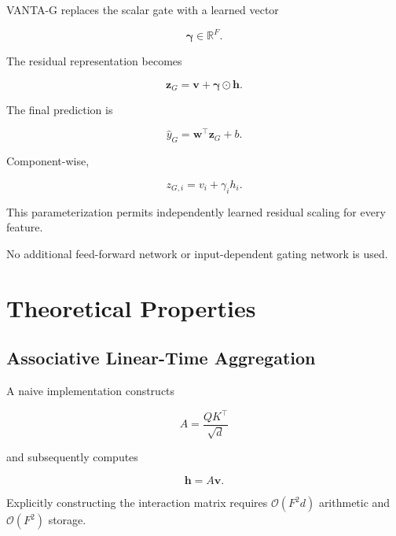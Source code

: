 \documentclass[11pt,a4paper]{article}
\newcommand{\R}{\mathbb{R}}
\newcommand{\od}{\odot}
\begin{document}
VANTA-G replaces the scalar gate with
a learned vector

\begin{equation}
\boldsymbol{\gamma}\in\R^F.
\end{equation}

The residual representation becomes

\begin{equation}
\boxed{
\mathbf{z}_G
=
\mathbf{v}
+
\boldsymbol{\gamma}\od\mathbf{h}.
}
\label{eq:residual_g}
\end{equation}

The final prediction is

\begin{equation}
\boxed{
\hat y_G
=
\mathbf{w}^{\top}\mathbf{z}_G+b.
}
\label{eq:prediction_g}
\end{equation}

Component-wise,

\begin{equation}
z_{G,i}=v_i+\gamma_i h_i.
\end{equation}

This parameterization permits independently
learned residual scaling for every feature.

No additional feed-forward network or
input-dependent gating network is used.

\section{Theoretical Properties}

\subsection{Associative Linear-Time Aggregation}

A naive implementation constructs

\begin{equation}
A=\frac{QK^\top}{\sqrt d}
\end{equation}

and subsequently computes

\begin{equation}
\mathbf{h}=A\mathbf{v}.
\end{equation}

Explicitly constructing the interaction
matrix requires $\mathcal{O}(F^2d)$
arithmetic and $\mathcal{O}(F^2)$ storage.
\end{document}
